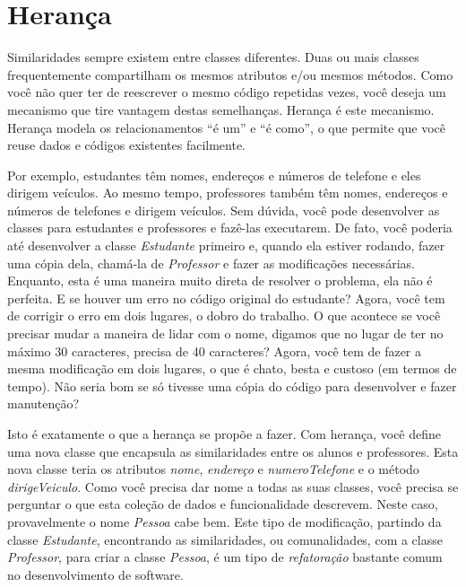 \section{Herança}

Similaridades sempre existem entre classes diferentes. Duas ou mais classes frequentemente compartilham os mesmos atributos e/ou mesmos métodos. Como você não quer ter de reescrever o mesmo código repetidas vezes, você deseja um mecanismo que tire vantagem destas semelhanças. Herança é este mecanismo. Herança modela os relacionamentos ``é um'' e ``é como'', o que permite que você reuse dados e códigos existentes facilmente.

Por exemplo, estudantes têm nomes, endereços e números de telefone e eles dirigem veículos. Ao mesmo tempo, professores também têm nomes, endereços e números de telefones e dirigem veículos. Sem dúvida, você pode desenvolver as classes para estudantes e professores e fazê-las executarem. De fato, você poderia até desenvolver a classe \emph{Estudante} primeiro e, quando ela estiver rodando, fazer uma cópia dela, chamá-la de \emph{Professor} e fazer as modificações necessárias. Enquanto, esta é uma maneira muito direta de resolver o problema, ela não é perfeita. E se houver um erro no código original do estudante? Agora, você tem de corrigir o erro em dois lugares, o dobro do trabalho. O que acontece se você precisar mudar a maneira de lidar com o nome, digamos que no lugar de ter no máximo 30 caracteres, precisa de 40 caracteres? Agora, você tem de fazer a mesma modificação em dois lugares, o que é chato, besta e custoso (em termos de tempo). Não seria bom se só tivesse uma cópia do código para desenvolver e fazer manutenção?

Isto é exatamente o que a herança se propõe a fazer. Com herança, você define uma nova classe que encapsula as similaridades entre os alunos e professores. Esta nova classe teria os atributos \emph{nome}, \emph{endereço} e \emph{numeroTelefone} e o método \emph{dirigeVeiculo}. Como você precisa dar nome a todas as suas classes, você precisa se perguntar o que esta coleção de dados e funcionalidade descrevem. Neste caso, provavelmente o nome \emph{Pessoa} cabe bem. Este tipo de modificação, partindo da classe \emph{Estudante}, encontrando as similaridades, ou comunalidades, com a classe \emph{Professor}, para criar a classe \emph{Pessoa}, é um tipo de \emph{refatoração} bastante comum no desenvolvimento de software.

